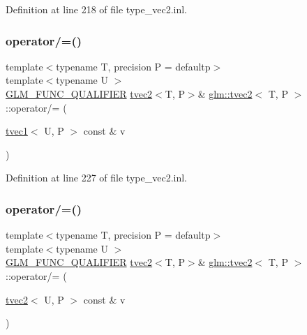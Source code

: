 Definition at line 218 of file type\+\_\+vec2.\+inl.

\mbox{\label{structglm_1_1tvec2_a19b74b0db17121ccf51b68fc25e579a2}} 
\subsubsection{\texorpdfstring{operator/=()}{operator/=()}\hspace{0.1cm}{\footnotesize\ttfamily [5/6]}}
{\footnotesize\ttfamily template$<$typename T, precision P = defaultp$>$ \\
template$<$typename U $>$ \\
\mbox{\hyperlink{setup_8hpp_a33fdea6f91c5f834105f7415e2a64407}{G\+L\+M\+\_\+\+F\+U\+N\+C\+\_\+\+Q\+U\+A\+L\+I\+F\+I\+ER}} \mbox{\hyperlink{structglm_1_1tvec2}{tvec2}}$<$T, P$>$\& \mbox{\hyperlink{structglm_1_1tvec2}{glm\+::tvec2}}$<$ T, P $>$\+::operator/= (\begin{DoxyParamCaption}\item[{\mbox{\hyperlink{structglm_1_1tvec1}{tvec1}}$<$ U, P $>$ const \&}]{v }\end{DoxyParamCaption})}



Definition at line 227 of file type\+\_\+vec2.\+inl.

\mbox{\label{structglm_1_1tvec2_a572fa5d63392fd44f7bbdd35cbed43ca}} 
\subsubsection{\texorpdfstring{operator/=()}{operator/=()}\hspace{0.1cm}{\footnotesize\ttfamily [6/6]}}
{\footnotesize\ttfamily template$<$typename T, precision P = defaultp$>$ \\
template$<$typename U $>$ \\
\mbox{\hyperlink{setup_8hpp_a33fdea6f91c5f834105f7415e2a64407}{G\+L\+M\+\_\+\+F\+U\+N\+C\+\_\+\+Q\+U\+A\+L\+I\+F\+I\+ER}} \mbox{\hyperlink{structglm_1_1tvec2}{tvec2}}$<$T, P$>$\& \mbox{\hyperlink{structglm_1_1tvec2}{glm\+::tvec2}}$<$ T, P $>$\+::operator/= (\begin{DoxyParamCaption}\item[{\mbox{\hyperlink{structglm_1_1tvec2}{tvec2}}$<$ U, P $>$ const \&}]{v }\end{DoxyParamCaption})}



